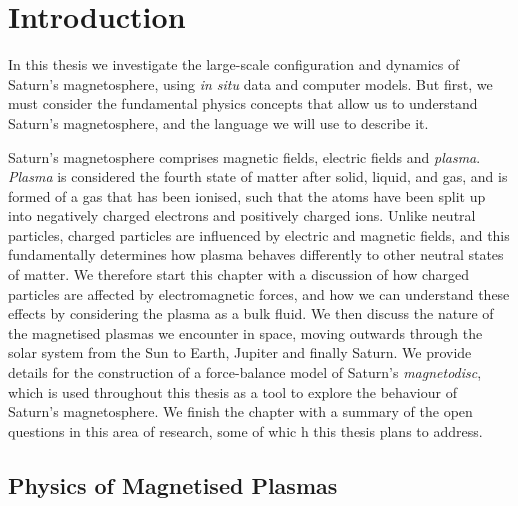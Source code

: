 \chapter{Introduction}
\label{chap:intro}
In this thesis we investigate the large-scale configuration and dynamics of Saturn's magnetosphere, using \textit{in situ} data and computer models. But first, we must consider the fundamental physics concepts that allow us to understand Saturn's magnetosphere, and the language we will use to describe it. 

Saturn's magnetosphere comprises magnetic fields, electric fields and \textit{plasma}. \textit{Plasma} is considered the fourth state of matter after solid, liquid, and gas, and is formed of a gas that has been ionised, such that the atoms have been split up into negatively charged electrons and positively charged ions. Unlike neutral particles, charged particles are influenced by electric and magnetic fields, and this fundamentally determines how plasma behaves differently to other neutral states of matter. We therefore start this chapter with a discussion of how charged particles are affected by electromagnetic forces, and how we can understand these effects by considering the plasma as a bulk fluid. We then discuss the nature of the magnetised plasmas we encounter in space, moving outwards through the solar system from the Sun to Earth, Jupiter and finally Saturn. We provide details for the construction of a force-balance model of Saturn's \textit{magnetodisc}, which is used throughout this thesis as a tool to explore the behaviour of Saturn's magnetosphere. We finish the chapter with a summary of the open questions in this area of research, some of whic h this thesis plans to address.

\section{Physics of Magnetised Plasmas}
